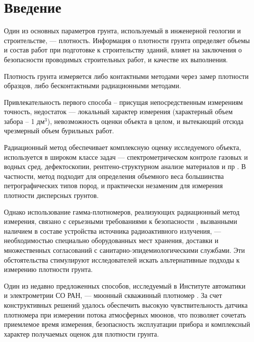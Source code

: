 \chapter*{Введение}							%

Один из основных параметров грунта, используемый в инженерной геологии и строительстве, ---
плотность. Информация о плотности грунта 
определяет объемы и состав работ при подготовке к строительству зданий, влияет на заключения о 
безопасности проводимых строительных работ, и качестве их выполнения\cite{gost5180, souzdornii}. 

Плотность грунта измеряется либо контактными методами через замер плотности образцов, 
либо бесконтактными радиационными методами.

Привлекательность первого способа – присущая непосредственным измерениям точность, недостаток ---
локальный характер измерения (характерный объем забора – 1 дм$^{3}$), невозможность оценки объекта в целом,
и вытекающий отсюда чрезмерный объем бурильных работ.

Радиационный метод обеспечивает комплексную оценку исследуемого объекта, используется в широком классе задач ---
спектрометрическом контроле газовых и водных сред, дефектоскопии, рентгено-структурном анализе материалов и пр \cite{gammaquant}. 
В частности, метод подходит для определения объемного веса большинства петрографических типов пород, и практически 
незаменим для измерения плотности дисперсных грунтов. 

Однако использование гамма-плотномеров, реализующих радиационный метод измерения, связано с серьезными требованиями 
к безопасности \cite{gost23061}, вызванными наличием в составе устройства источника радиоактивного излучения, --- необходимостью 
специально оборудованных мест хранения, доставки и множественных согласований с санитарно-эпидемиологическими службами. 
Эти обстоятельства стимулируют исследователей искать альтернативные подходы к измерению плотности грунта. 

Один из недавно предложенных способов, исследуемый в Институте автоматики и электрометрии СО РАН, ---
мюонный скважинный плотномер \cite{patentdensitometer}. За счет конструктивных решений удалось обеспечить высокую чувствительность 
датчика плотномера при измерении потока атмосферных мюонов, что позволяет сочетать приемлемое время измерения, 
безопасность эксплуатации прибора и комплексный характер получаемых оценок для плотности грунта.

